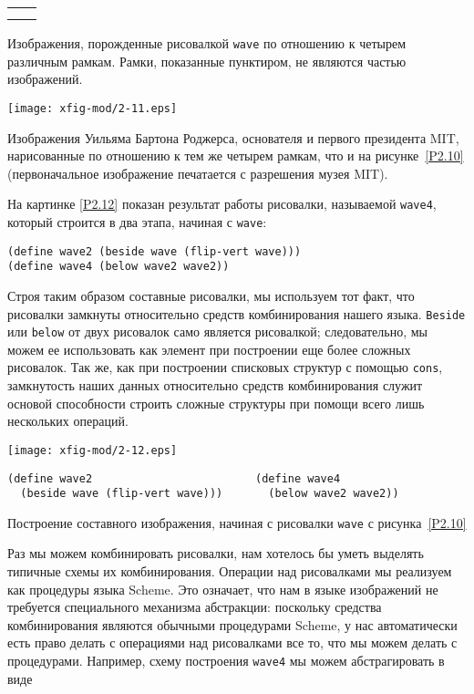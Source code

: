 \begin{cntrfig}
\begin{tabular}{cc}
 &  \\
 & 
\end{tabular}
\caption{Изображения, порожденные рисовалкой
{\tt wave} по отношению к четырем различным рамкам.  Рамки,
показанные пунктиром, не являются частью изображений.}
\label{P2.10}

\end{cntrfig}

\begin{cntrfig}%
\texttt{[image: xfig-mod/2-11.eps]}
\caption{Изображения Уильяма Бартона Роджерса, основателя и первого президента MIT,
нарисованные по отношению к тем же четырем рамкам, что и на 
рисунке~\ref{P2.10} (первоначальное изображение печатается с
разрешения музея MIT).}
\label{P2.11}
\end{cntrfig}

На картинке \ref{P2.12} показан результат
работы рисовалки, называемой {\tt wave4}, который строится в
два этапа, начиная с {\tt wave}:

\begin{Verbatim}[fontsize=\small]
(define wave2 (beside wave (flip-vert wave)))
(define wave4 (below wave2 wave2))
\end{Verbatim}
Строя таким образом составные рисовалки, мы используем тот факт, что
рисовалки замкнуты относительно средств комбинирования нашего
языка. {\tt Beside} или {\tt below} от двух рисовалок
само является рисовалкой; следовательно, мы можем ее использовать как
элемент при построении еще более сложных рисовалок.  Так же, как при
построении списковых структур с помощью {\tt cons}, замкнутость 
наших данных относительно средств комбинирования служит основой
способности строить сложные структуры при помощи всего лишь нескольких 
операций.

\begin{cntrfig}
\texttt{[image: xfig-mod/2-12.eps]}
\begin{Verbatim}
(define wave2                         (define wave4
  (beside wave (flip-vert wave)))       (below wave2 wave2))
\end{Verbatim}
\caption{Построение составного изображения,
начиная с рисовалки {\tt wave} с рисунка~\ref{P2.10}}
\label{P2.12}

\end{cntrfig}
Раз мы можем комбинировать рисовалки, нам хотелось бы
уметь выделять типичные схемы их комбинирования.  Операции над
рисовалками мы реализуем как процедуры языка Scheme. Это означает, что 
нам в языке изображений не требуется специального механизма
абстракции:  поскольку средства комбинирования являются обычными
процедурами Scheme, у нас автоматически есть право делать с операциями 
над рисовалками все то, что мы можем делать с процедурами.  Например,
схему построения {\tt wave4} мы можем абстрагировать в виде

